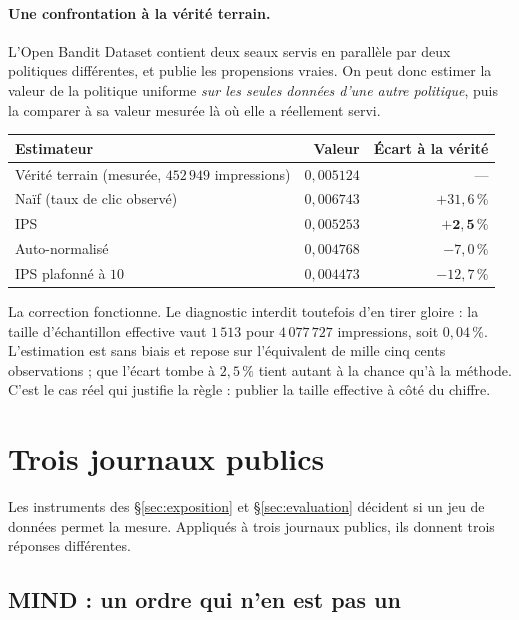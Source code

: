 \documentclass[11pt,a4paper]{article}
\begin{document}
\paragraph{Une confrontation à la vérité terrain.} L'Open Bandit Dataset
\citep{saito2020} contient deux seaux servis en parallèle par deux politiques différentes,
et publie les propensions vraies. On peut donc estimer la valeur de la politique uniforme
\emph{sur les seules données d'une autre politique}, puis la comparer à sa valeur mesurée là
où elle a réellement servi.

\begin{center}
\begin{tabular}{@{}lrr@{}}
\toprule
\textbf{Estimateur} & \textbf{Valeur} & \textbf{Écart à la vérité} \\
\midrule
Vérité terrain (mesurée, $452\,949$ impressions) & $0{,}005124$ & --- \\
Naïf (taux de clic observé) & $0{,}006743$ & $+31{,}6\,\%$ \\
IPS & $0{,}005253$ & $\mathbf{+2{,}5\,\%}$ \\
Auto-normalisé & $0{,}004768$ & $-7{,}0\,\%$ \\
IPS plafonné à $10$ & $0{,}004473$ & $-12{,}7\,\%$ \\
\bottomrule
\end{tabular}
\end{center}

La correction fonctionne. Le diagnostic interdit toutefois d'en tirer gloire : la taille
d'échantillon effective vaut $1\,513$ pour $4\,077\,727$ impressions, soit $0{,}04\,\%$.
L'estimation est sans biais et repose sur l'équivalent de mille cinq cents observations ;
que l'écart tombe à $2{,}5\,\%$ tient autant à la chance qu'à la méthode. C'est le cas réel
qui justifie la règle : publier la taille effective à côté du chiffre.

\section{Trois journaux publics}
\label{sec:journaux}

Les instruments des \S\ref{sec:exposition} et \S\ref{sec:evaluation} décident si un jeu de
données permet la mesure. Appliqués à trois journaux publics, ils donnent trois réponses
différentes.

\subsection{MIND : un ordre qui n'en est pas un}
\end{document}
